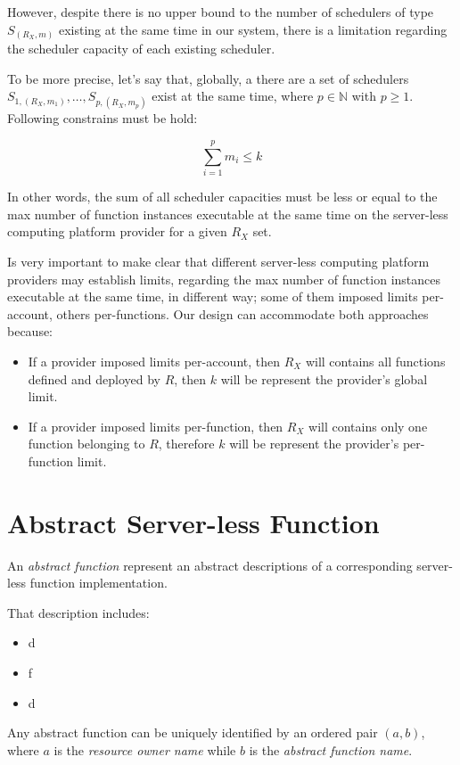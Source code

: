 \documentclass[10pt,a4paper]{article}
\begin{document}
However, despite there is no upper bound to the number of schedulers of type $S_{({R_{X}},m)}$ existing at the same time in our system, there is a limitation regarding the scheduler capacity of each existing scheduler. 

To be more precise, let's say that, globally, a there are a set of schedulers $S_{1,({R_{X}},m_1)}, \ldots , S_{p,({R_{X}},m_p)}$ exist at the same time, where $p \in \mathbb{N}$ with $p \geq 1$. Following constrains must be hold:

\begin{equation}
\sum_{i=1}^{p} m_i \leq k
\end{equation}

In other words, the sum of all scheduler capacities must be less or equal to the max number of function instances executable at the same time on the server-less computing platform provider for a given $R_{X}$ set.

Is very important to make clear that different server-less computing platform providers may establish limits, regarding the max number of function instances executable at the same time, in different way; some of them imposed limits per-account, others per-functions. Our design can accommodate both approaches because:
\begin{itemize}
\item If a provider imposed limits per-account, then $R_{X}$ will contains all functions defined and deployed by $R$, then $k$ will be represent the provider's global limit.
\item If a provider imposed limits per-function, then $R_{X}$ will contains only one function belonging to $R$, therefore $k$ will be represent the provider's per-function limit.
\end{itemize}


\section{Abstract Server-less Function}

An \textit{abstract function} represent an abstract descriptions of a corresponding server-less function implementation.

That description includes:
\begin{itemize}
\item d
\item f
\item d
\end{itemize}

Any abstract function can be uniquely identified by an ordered pair $(a, b)$, where $a$ is the \textit{resource owner name} while $b$ is the \textit{abstract function name}.
\end{document}

